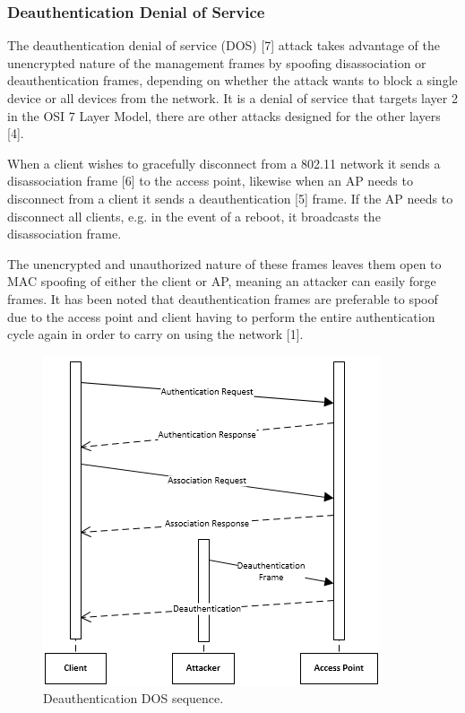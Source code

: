 \subsubsection{Deauthentication Denial of Service}
The deauthentication denial of service (DOS) [7] attack takes advantage of the unencrypted nature of the management frames by spoofing disassociation or deauthentication frames, depending on whether the attack wants to block a single device or all devices from the network. It is a denial of service that targets layer 2 in the OSI 7 Layer Model, there are other attacks designed for the other layers [4].

When a client wishes to gracefully disconnect from a 802.11 network it sends a disassociation frame [6] to the access point, likewise when an AP needs to disconnect from a client it sends a deauthentication [5] frame. If the AP needs to disconnect all clients, e.g. in the event of a reboot, it broadcasts the disassociation frame. 

The unencrypted and unauthorized nature of these frames leaves them open to MAC spoofing of either the client or AP, meaning an attacker can easily forge frames. It has been noted that deauthentication frames are preferable to spoof due to the access point and client having to perform the entire authentication cycle again in order to carry on using the network [1].

\begin{figure}[htbp!]
\centering\includegraphics{research/attackvectors/figures/ddos.png}
\caption{Deauthentication DOS sequence.}
\end{figure}

